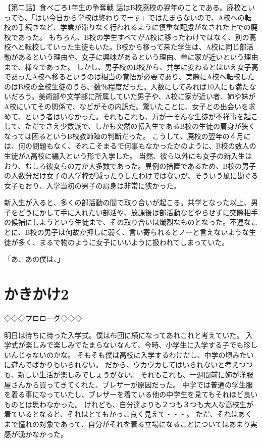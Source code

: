 【第二話】食べごろ1年生の争奪戦
話はB校廃校の翌年のことである。廃校といっても、「はい今日から学校は終わりでーす」ではたまらないので、A校への転校の手続きなど、学業が滞りなく行われるように慎重な配慮がなされた上での廃校であった。
もちろん、B校の学生すべてがA校に移ったわけではなく、別の高校へと転校していった生徒もいた。B校から移って来た学生は、A校に同じ部活動があるという理由や、女子に興味があるという理由、単に家が近いという理由まで、様々であった。
しかし、男子校のB校から、共学に変わるとはいえ女子高であったA校へ移るというのは相当の覚悟が必要であり、実際にA校へ転校したのはB校の全校生徒のうち、数％程度だった。人数にしてみれば10人にも満たないだろう。美術部や文学部に所属していた男子や、A校に家が近い者、姉や妹がA校にいてその関係で、などがその内訳だ。驚いたことに、女子との出会いを求めて、という者はいなかった。それもこれも、万が一そんな生徒が不祥事を起こして、ただでさえ少数派で、しかも突然の転入生であるB校の生徒の肩身が狭くなっては困るというB校教師陣の判断だった。
こうして、廃校の翌年の４月には、何の問題もなく、それこそまるで何事もなかったかのように、B校の数人の生徒がA高校に編入という形で入学した。
当然、彼ら以外にも女子の新入生はおり、むしろ彼女らの方が大多数であった。異例の措置であるため、B校の男子の人数分だけ女子の入学枠が減ったりしたわけではないが、そういう風に勘ぐる女子もおり、入学当初の男子の肩身は非常に狭かった。

新入生が入ると、多くの部活動の間で取り合いが起こる。共学となった以上、男子をどうにかして手に入れたい部活や、放課後は部活動などやらせずに交際相手の候補にしようという生徒まで、その取り合いは熾烈なものとなった。不運なことに、B校の男子は何故か押しに弱く、言い寄られるとノーと言えないような生徒が多く、まるで物のように女子にいいように扱われてしまっていた。

「あ、あの僕は、」

\section{かきかけ2}

◇◇◇プロローグ◇◇◇

明日は待ちに待った入学式。僕は布団に横になってあれこれと考えていた。
入学式が楽しみで楽しみでたまらないなんて、今時、小学生に入学する子でも珍しいんじゃないのかな。
そもそも僕は高校に入学するわけだし、中学の頃みたいに遊んでばかりもいられない。
だから、ウカウカしてはいられないと考えつつも、新しい生活が楽しみでしょうがない。
それもこれも、一週間前に姉が洋服屋さんから買ってきてくれた、ブレザーが原因だった。
中学では普通の学生服を着る事になっていたし、ブレザーを着ている他の中学生を見てもそれほど良いものとは思わなかった。
けれども、自分達よりも２つも３つも大人な高校生が着ているとなると、それはとてもかっこ良く見えて・・・。
ただ、それはあくまで憧れの対象であって、自分がそれを着る立場になることについてはあまり実感が湧かなかった。

